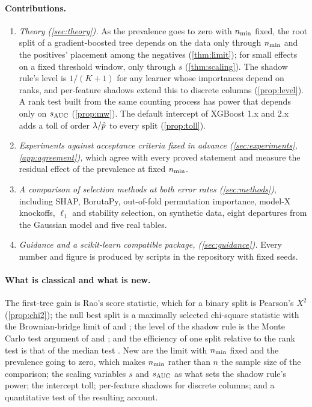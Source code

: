 \paragraph{Contributions.}
\begin{enumerate}
\item \emph{Theory (\cref{sec:theory}).} As the prevalence goes to zero with $n_{\min}$ fixed, the root split of a gradient-boosted tree depends on the data only through $n_{\min}$ and the positives' placement among the negatives (\cref{thm:limit}); for small effects on a fixed threshold window, only through $s$ (\cref{thm:scaling}). The shadow rule's level is $1/(K+1)$ for any learner whose importances depend on ranks, and per-feature shadows extend this to discrete columns (\cref{prop:level}). A rank test built from the same counting process has power that depends only on $s_{\mathrm{AUC}}$ (\cref{prop:mw}). The default intercept of XGBoost 1.x and 2.x adds a toll of order $\lambda/\hat p$ to every split (\cref{prop:toll}).
\item \emph{Experiments against acceptance criteria fixed in advance (\cref{sec:experiments}, \cref{app:agreement}),} which agree with every proved statement and measure the residual effect of the prevalence at fixed $n_{\min}$.
\item \emph{A comparison of selection methods at both error rates (\cref{sec:methods})}, including SHAP, BorutaPy, out-of-fold permutation importance, model-X knockoffs, $\ell_1$ and stability selection, on synthetic data, eight departures from the Gaussian model and five real tables.
\item \emph{Guidance and a scikit-learn compatible package, \pkg{} (\cref{sec:guidance}).} Every number and figure is produced by scripts in the repository with fixed seeds.
\end{enumerate}

\paragraph{What is classical and what is new.} The first-tree gain is Rao's score statistic, which for a binary split is Pearson's $X^2$ (\cref{prop:chi2}); the null best split is a maximally selected chi-square statistic with the Brownian-bridge limit of \citet{miller1982maximally} and \citet{lausen1992maximally}; the level of the shadow rule is the Monte Carlo test argument of \citet{barnard1963discussion} and \citet{besag1989generalized}; and the efficiency of one split relative to the rank test is that of the median test \citep{mood1954asymptotic}. New are the limit with $n_{\min}$ fixed and the prevalence going to zero, which makes $n_{\min}$ rather than $n$ the sample size of the comparison; the scaling variables $s$ and $s_{\mathrm{AUC}}$ as what sets the shadow rule's power; the intercept toll; per-feature shadows for discrete columns; and a quantitative test of the resulting account.

